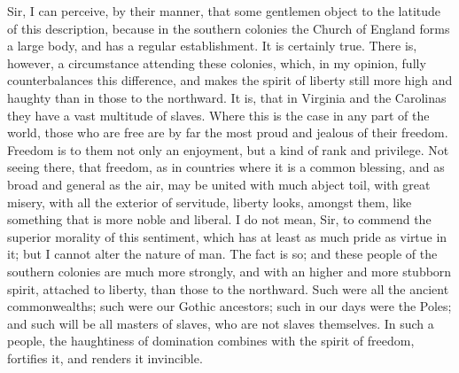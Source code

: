 Sir, I can perceive, by their manner, that some gentlemen object to the latitude of this description, because in the southern colonies the Church of England forms a large body, and has a regular establishment. It is certainly true. There is, however, a circumstance attending these colonies, which, in my opinion, fully counterbalances this difference, and makes the spirit of liberty still more high and haughty than in those to the northward. It is, that in Virginia and the Carolinas they have a vast multitude of slaves. Where this is the case in any part of the world, those who are free are by far the most proud and jealous of their freedom. Freedom is to them not only an enjoyment, but a kind of rank and privilege. Not seeing there, that freedom, as in countries where it is a common blessing, and as broad and general as the air, may be united with much abject toil, with great misery, with all the exterior of servitude, liberty looks, amongst them, like something that is more noble and liberal. I do not mean, Sir, to commend the superior morality of this sentiment, which has at least as much pride as virtue in it; but I cannot alter the nature of man. The fact is so; and these people of the southern colonies are much more strongly, and with an higher and more stubborn spirit, attached to liberty, than those to the northward. Such were all the ancient commonwealths; such were our Gothic ancestors; such in our days were the Poles; and such will be all masters of slaves, who are not slaves themselves. In such a people, the haughtiness of domination combines with the spirit of freedom, fortifies it, and renders it invincible.

